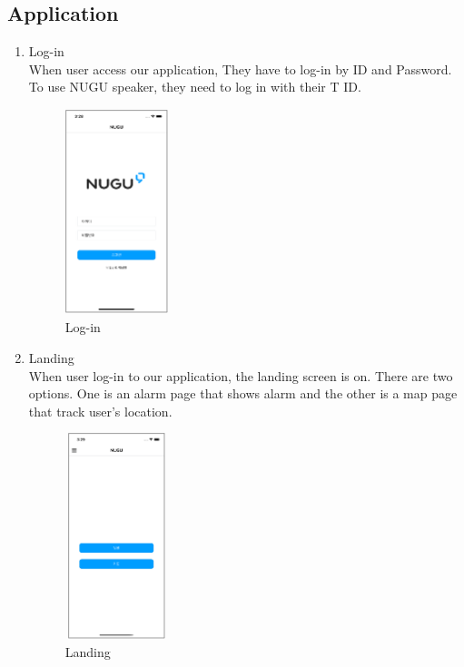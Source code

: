 \documentclass[conference]{IEEEtran}
\begin{document}
\subsection{Application}
\begin{enumerate}
    \item Log-in\\
    When user access our application, They have to log-in by  ID and Password. To use NUGU speaker, they need to log in with their T ID.\\
    \begin{figure}[htbp]
        \centering
        \includegraphics[width=3cm, height=6cm]{images/figure9.png}
        \caption{Log-in}
    \end{figure}
    
    \item Landing\\
    When user log-in to our application, the landing screen is on. There are two options. One is an alarm page that shows alarm and the other is a map page that track user’s location.\\
    \begin{figure}[htbp]
        \centering
        \includegraphics[width=3cm, height=6cm]{images/figure10.png}
        \caption{Landing}
    \end{figure}
    

\end{enumerate}
\end{document}
